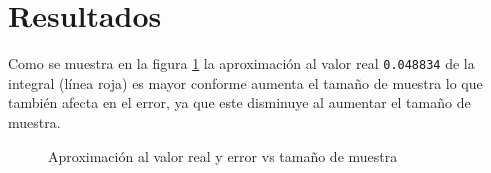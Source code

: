 \documentclass{article}
\begin{document}
\section{Resultados}

Como se muestra en la figura \ref{figura 1} la aproximación al valor real \texttt{0.048834} de la integral (línea roja) es mayor conforme aumenta el tamaño de muestra lo que también afecta en el error, ya que este disminuye al aumentar el tamaño de muestra.

\begin{figure}[htbp]
\centering
{}
\caption{Aproximación al valor real y error vs tamaño de muestra} \label{figura 1}
\end{figure}
\end{document}
